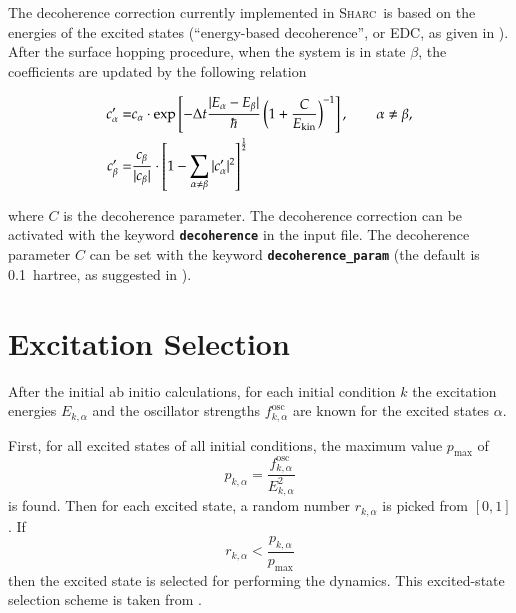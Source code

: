 \documentclass[a4paper,11pt,DIV=15,openany,twoside=false]{scrbook}
\newcommand{\ttmdump}[1]{#1}
\newcommand{\sharc}{\textsc{Sharc}}
\newcommand{\ttt}[1]{\textbf{\texttt{#1}}}
\begin{document}
The decoherence correction currently implemented in \sharc\ is based on the energies of the excited states (``energy-based decoherence'', or EDC, as given in \cite{Granucci2010JCP}). After the surface hopping procedure, when the system is in state $\beta$, the coefficients are updated by the following relation
\ttmdump{
  \begin{align}
    c_\alpha^\prime=&
    c_\alpha\cdot\exp
    \left[
      -\Delta t\frac{|E_\alpha-E_\beta|}{\hbar}
      \left(
        1+\frac{C}{E_{\text{kin}}}
      \right)^{-1}
    \right],\qquad \alpha\neq\beta,\\
    c_\beta^\prime=&
    \frac{c_\beta}{|c_\beta|}\cdot
    \left[
      1-\sum\limits_{\alpha\neq\beta}^{\vphantom{\alpha}} |c^\prime_\alpha|^2
    \right]^{\frac{1}{2}}
  \end{align}
}
where $C$ is the decoherence parameter. The decoherence correction can be activated with the keyword \ttt{decoherence} in the input file. The decoherence parameter $C$ can be set with the keyword \ttt{decoherence\_param} (the default is 0.1~hartree, as suggested in \cite{Granucci2010JCP}).


\section{Excitation Selection}\label{met:exc_selection}

After the initial ab initio calculations, for each initial condition $k$ the excitation energies $E_{k,\alpha}$ and the oscillator strengths $f^{\text{osc}}_{k,\alpha}$ are known for the excited states $\alpha$.

First, for all excited states of all initial conditions, the maximum value $p_{\text{max}}$ of 
\begin{equation}
  p_{k,\alpha}=\frac{f^{\text{osc}}_{k,\alpha}}{E_{k,\alpha}^2} \label{eq:exc_prob}
\end{equation}
is found. Then for each excited state, a random number $r_{k,\alpha}$ is picked from $[0,1]$. If
\begin{equation}
  r_{k,\alpha}<\frac{p_{k,\alpha}}{p_{\text{max}}}
\end{equation}
then the excited state is selected for performing the dynamics. This excited-state selection scheme is taken from \cite{Barbatti2011}.
\end{document}
